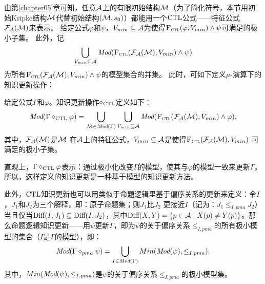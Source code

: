 由第\ref{chapter05}章可知，任意${\cal A}$上的有限初始结构${\cal M}$（为了简化符号，本节用初始Kripke结构${\cal M}$代替初始结构$({\cal M},s_0)$）都能用一个$\textrm{CTL}$公式——特征公式${\cal F}_{{\cal A}}({\cal M})$来表示。%
给定公式$\varphi$和$\psi$，$V_{min}\subseteq {\cal A}$为使得${\textsc{F}_{\textsc{ctl}}}(\varphi, V_{min}) \wedge \psi$可满足的极小子集。
此外，记
$$\bigcup_{V_{min}\subseteq {\cal A}} \textit{Mod}({\textsc{F}_{\textsc{ctl}}}({\cal F}_{{\cal A}}({\cal M}), V_{min}) \wedge \psi)$$
为所有${\textsc{F}_{\textsc{ctl}}}({\cal F}_{{\cal A}}({\cal M}), V_{min}) \wedge \psi$的模型集合的并集。
此时，可如下定义$\mu$-演算下的知识更新操作：


\begin{definition}\label{def:KU}
	给定公式$\Gamma$和$\varphi$。知识更新操作$\diamond_{\textrm{CTL}}$定义如下：
	\[
	\textit{Mod}(\Gamma \diamond_{\textrm{CTL}} \varphi) = \bigcup_{{\cal M} \in \textit{Mod}(\Gamma)} \bigcup_{V_{min}\subseteq {\cal A}} \textit{Mod}({\textsc{F}_{\textsc{ctl}}}({\cal F}_{{\cal A}}({\cal M}), V_{min}) \wedge \varphi),
	\]
	其中，${\cal F}_{{\cal A}}({\cal M})$是${\cal M}$ 在${\cal A}$上的特征公式，$V_{min} \subseteq {\cal A}$是使得${\textsc{F}_{\textsc{ctl}}}({\cal F}_{{\cal A}}({\cal M}), V_{min})$ 可满足的极小子集。
\end{definition}

直观上，$\Gamma \diamond_{\textrm{CTL}} \varphi$表示：通过极小化改变$\Gamma$的模型，使其与$\varphi$的模型一致来更新$\Gamma$。
所以，这样定义的知识更新是一种基于模型的知识更新方法。

此外，$\textrm{CTL}$知识更新也可以用类似于命题逻辑里基于偏序关系的更新来定义：令$I$，$J_1$和$J_2$为三个解释，即：原子命题集；则$J_1$比$J_2$ 更接近$I$（记为：$J_1 \leq_{I,pma} J_2$）当且仅当$\textrm{Diff}(I, J_1) \subseteq \textrm{Diff}(I, J_2)$，其中$\textrm{Diff}(X, Y) =\{p\in {\cal A} \mid X(p) \not = Y(p)\}$。那么命题逻辑知识更新——用$\psi$更新$\Gamma$，即为$\psi$的关于偏序关系$\leq_{I,pma}$的所有极小模型的集合（$I$是$\Gamma$的模型），即：
$$\textit{Mod}(\Gamma \diamond_{pma} \psi) = \bigcup_{I \in \textit{Mod}(\Gamma)} Min(\textit{Mod}(\psi), \leq_{I,pma}).$$
其中，$Min(\textit{Mod}(\psi), \leq_{I,pma})$是$\psi$的关于偏序关系$\leq_{I,pma}$的极小模型集。


